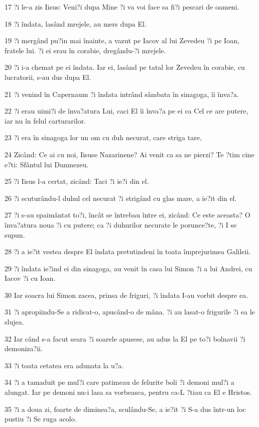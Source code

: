 \par 17 ?i le-a zis Iisus: Veni?i dupa Mine ?i va voi face sa fi?i pescari de oameni.
\par 18 ?i îndata, lasând mrejele, au mers dupa El.
\par 19 ?i mergând pu?in mai înainte, a vazut pe Iacov al lui Zevedeu ?i pe Ioan, fratele lui. ?i ei erau în corabie, dregându-?i mrejele.
\par 20 ?i i-a chemat pe ei îndata. Iar ei, lasând pe tatal lor Zevedeu în corabie, cu lucratorii, s-au dus dupa El.
\par 21 ?i venind în Capernaum ?i îndata intrând sâmbata în sinagoga, îi înva?a.
\par 22 ?i erau uimi?i de înva?atura Lui, caci El îi înva?a pe ei ca Cel ce are putere, iar nu în felul carturarilor.
\par 23 ?i era în sinagoga lor un om cu duh necurat, care striga tare,
\par 24 Zicând: Ce ai cu noi, Iisuse Nazarinene? Ai venit ca sa ne pierzi? Te ?tim cine e?ti: Sfântul lui Dumnezeu.
\par 25 ?i Iisus l-a certat, zicând: Taci ?i ie?i din el.
\par 26 ?i scuturându-l duhul cel necurat ?i strigând cu glas mare, a ie?it din el.
\par 27 ?i s-au spaimântat to?i, încât se întrebau între ei, zicând: Ce este aceasta? O înva?atura noua ?i cu putere; ca ?i duhurilor necurate le porunce?te, ?i I se supun.
\par 28 ?i a ie?it vestea despre El îndata pretutindeni în toata împrejurimea Galileii.
\par 29 ?i îndata ie?ind ei din sinagoga, au venit în casa lui Simon ?i a lui Andrei, cu Iacov ?i cu Ioan.
\par 30 Iar soacra lui Simon zacea, prinsa de friguri, ?i îndata I-au vorbit despre ea.
\par 31 ?i apropiindu-Se a ridicat-o, apucând-o de mâna. ?i au lasat-o frigurile ?i ea le slujea.
\par 32 Iar când s-a facut seara ?i soarele apusese, au adus la El pe to?i bolnavii ?i demoniza?ii.
\par 33 ?i toata cetatea era adunata la u?a.
\par 34 ?i a tamaduit pe mul?i care patimeau de felurite boli ?i demoni mul?i a alungat. Iar pe demoni nu-i lasa sa vorbeasca, pentru ca-L ?tiau ca El e Hristos.
\par 35 ?i a doua zi, foarte de diminea?a, sculându-Se, a ie?it ?i S-a dus într-un loc pustiu ?i Se ruga acolo.
